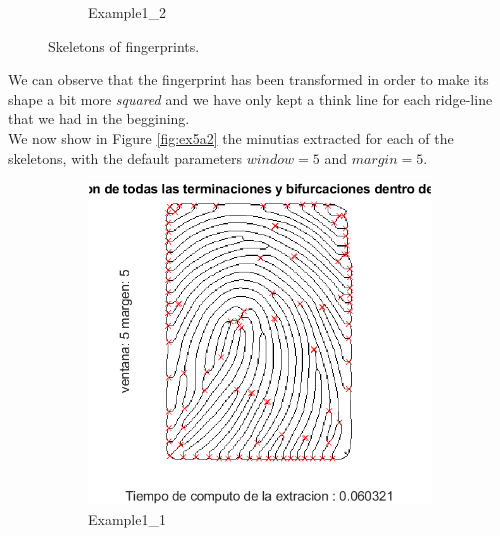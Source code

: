 \documentclass[a4paper]{article}
\begin{document}
\begin{figure}[H]
\begin{subfigure}[t]{0.45\textwidth}
         \caption{Example1\_2}
     \end{subfigure}
    \caption{Skeletons of fingerprints.}
    \label{fig:ex5a}
\end{figure}

We can observe that the fingerprint has been transformed in order to make its shape a bit more \emph{squared} and we have only kept a think line for each ridge-line that we had in the beggining.\\

We now show in Figure \ref{fig:ex5a2} the minutias extracted for each of the skeletons, with the default parameters \(window=5\) and \(margin=5\).

\begin{figure}[H]
  \centering
       \begin{subfigure}[t]{0.45\textwidth}
         \centering
         \includegraphics[scale=0.6]{Figures/Minutiae1}
         \caption{Example1\_1}
     \end{subfigure}%
     \quad
     \begin{subfigure}[t]{0.45\textwidth}
         \centering

\end{subfigure}
\end{figure}
\end{document}
